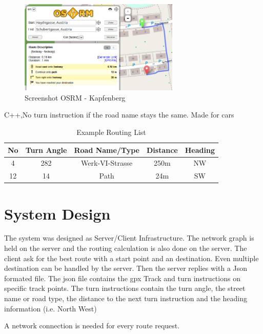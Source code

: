 \documentclass{sig-alternate}
\begin{document}
\begin{figure}
\centering
\includegraphics[width=3in]{osrm-ss.png}
\caption{Screenshot OSRM - Kapfenberg}
\end{figure}

C++,No turn instruction if the road name stays the same. Made for cars


\begin{table}
\centering
\caption{Example Routing List}
\begin{tabular}{|c|c|c|c|c|} \hline
No&Turn Angle&Road Name/Type&Distance&Heading\\ \hline
4&282&Werk-VI-Strasse&250m&NW\\ \hline
12&14&Path&24m&SW\\ \hline
\end{tabular}
\end{table}



\section{System Design}
The system was designed as Server/Client Infrastructure. The network graph is held on the server and the routing calculation is also done on the server.  The client ask for the best route with a start point and an destination. Even multiple destination can be handled by the server. Then the server replies with a Json formated file. The json file contains the gpx Track and turn instructions on specific track points. The turn instructions contain the turn angle, the street name or road type, the distance to the next turn instruction and the heading information (i.e. North West) 

A network connection is needed for every route request. 
\end{document}
